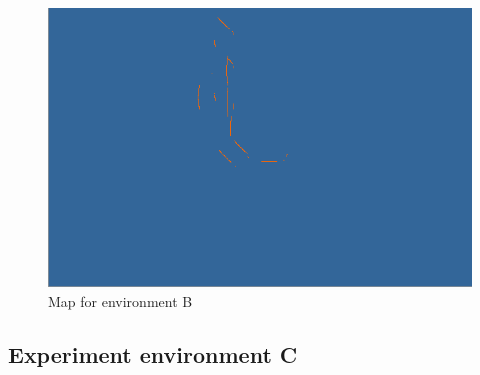 \begin{figure}[h]
\centering
\includegraphics[scale=0.4]{Chapter4/images/experiment_2_map.png}
\caption{Map for environment B}
\label{fig:experiment_b_map}
\end{figure}

\subsection{Experiment environment C}

